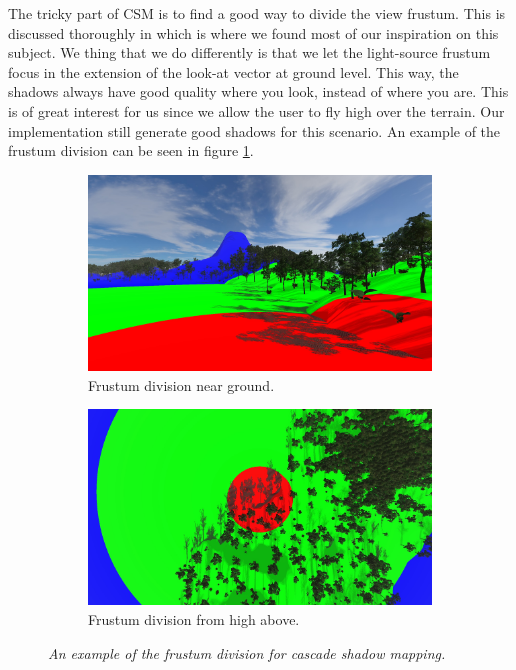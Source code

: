 The tricky part of CSM is to find a good way to divide the view frustum. This is discussed thoroughly in \cite{CascadeShadowMapping} which is where we found most of our inspiration on this subject. We thing that we do differently is that we let the light-source frustum focus in the extension of the look-at vector at ground level. This way, the shadows always have good quality where you look, instead of where you are. This is of great interest for us since we allow the user to fly high over the terrain. Our implementation still generate good shadows for this scenario. An example of the frustum division can be seen in figure \ref{fig:SMRGBCascade}.

\begin{figure}[H]
\begin{subfigure}{.5\textwidth}
  \centering
  \includegraphics[width=0.9\linewidth]{images/SMRGBCascade.jpg}
  \caption{Frustum division near ground.}
  \label{fig:SMRGBCascade}
\end{subfigure}%
\begin{subfigure}{.5\textwidth}
  \centering
  \includegraphics[width=0.9\linewidth]{images/SMRGBCascade2.jpg}
  \caption{Frustum division from high above.}
  \label{fig:SMRGBCascade2}
\end{subfigure}
\caption[Cascade Shadow Mapping]{\textit{An example of the frustum division for cascade shadow mapping.}}
\label{fig:CascadeShadowMapping}
\end{figure}

